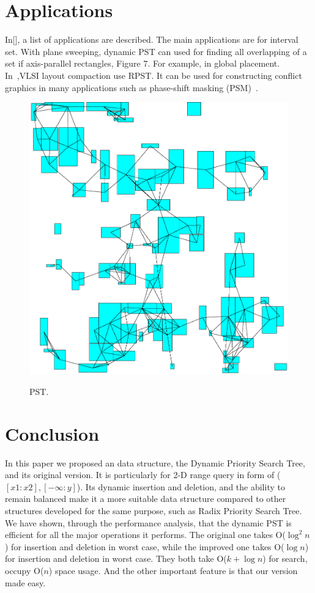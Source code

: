 \documentclass{acm_proc_article-sp}
\begin{document}
\section{Applications}
In[], a list of applications are described. The main applications
are for interval set. With plane sweeping, dynamic PST can used for
finding all overlapping of a set if axis-parallel rectangles, Figure 7. For
example, in global placement. In~\cite{DAC_05},VLSI layout
compaction use RPST. It can be used for constructing conflict
graphics in many applications such as phase-shift
masking (PSM)~\cite{PSM_05}.

\begin{figure}[!h]
  \centering
  \includegraphics[scale=0.5]{conflict}\\
  \caption{PST.}\label{fig:conflict}
\end{figure}

\section{Conclusion}
In this paper we proposed an data structure, the Dynamic Priority
Search Tree, and its original version. It is particularly for 2-D
range query in form of ($[x1:x2],[-\infty:y]$). Its dynamic
insertion and deletion, and the ability to remain balanced make it a
more suitable data structure compared to other structures developed
for the same purpose, such as Radix Priority Search Tree. We have
shown, through the performance analysis, that the dynamic PST is
efficient for all the major operations it performs. The original one
takes O($\log^2n$) for insertion and deletion in worst case, while
the improved one takes O($\log n$) for insertion and deletion in
worst case. They both take O($k+\log n$) for search, occupy O($n$)
space usage. And the other important feature is that our version
made easy.



\end{document}
